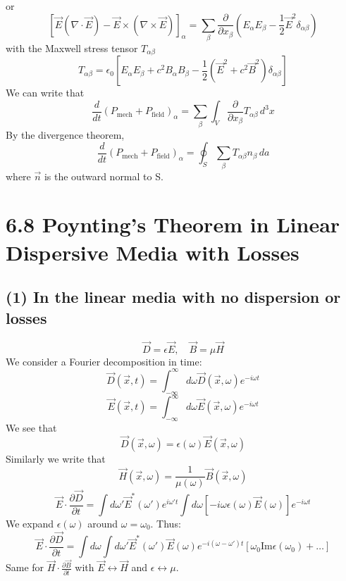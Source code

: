 \documentclass{article}
\begin{document}
\begin{enumerate}
		or
		\[ [ \vec{E}(\nabla \cdot \vec{E}) - \vec{E} \times (\nabla \times \vec{E}) ]_\alpha = \sum_\beta \frac{\partial}{\partial x_\beta} \left( E_\alpha E_\beta - \frac{1}{2} \vec{E}^2 \delta_{\alpha\beta} \right) \]
		with the Maxwell stress tensor $T_{\alpha\beta}$
		\[ T_{\alpha\beta} = \epsilon_0 \left[ E_\alpha E_\beta + c^2 B_\alpha B_\beta - \frac{1}{2} (\vec{E}^2 + c^2 \vec{B}^2) \delta_{\alpha\beta} \right] \]
		We can write that
		\[ \frac{d}{dt} (P_{\text{mech}} + P_{\text{field}})_\alpha = \sum_\beta \int_V \frac{\partial}{\partial x_\beta} T_{\alpha\beta} \, d^3x \]
		By the divergence theorem,
		\[ \frac{d}{dt} (P_{\text{mech}} + P_{\text{field}})_\alpha = \oint_S \sum_\beta T_{\alpha\beta} n_\beta \, da \]
		where $\vec{n}$ is the outward normal to S.
		
	\end{enumerate}
	\section*{6.8 Poynting's Theorem in Linear Dispersive Media with Losses}
	\subsection*{(1) In the linear media with no dispersion or losses}
	\[
	\vec{D} = \epsilon \vec{E}, \quad \vec{B} = \mu \vec{H}
	\]
	We consider a Fourier decomposition in time:
	\[
	\vec{D}(\vec{x}, t) = \int_{-\infty}^{\infty} d\omega \vec{D}(\vec{x}, \omega) e^{-i\omega t}
	\]
	\[
	\vec{E}(\vec{x}, t) = \int_{-\infty}^{\infty} d\omega \vec{E}(\vec{x}, \omega) e^{-i\omega t}
	\]
	We see that
	\[
	\vec{D}(\vec{x}, \omega) = \epsilon(\omega) \vec{E}(\vec{x}, \omega)
	\]
	Similarly we write that
	\[
	\vec{H}(\vec{x}, \omega) = \frac{1}{\mu(\omega)} \vec{B}(\vec{x}, \omega)
	\]
	\[
	\vec{E} \cdot \frac{\partial\vec{D}}{\partial t} = \int d\omega' \vec{E}^*(\omega') e^{i\omega' t} \int d\omega [-i\omega \epsilon(\omega) \vec{E}(\omega)] e^{-i\omega t}
	\]
	We expand $\epsilon(\omega)$ around $\omega = \omega_0$.
	Thus:
	\[
	\vec{E} \cdot \frac{\partial \vec{D}}{\partial t} = \int d\omega \int d\omega' \vec{E}^*(\omega') \vec{E}(\omega) e^{-i(\omega-\omega')t} [ \omega_0 \text{Im} \epsilon(\omega_0) + \dots ]
	\]
	Same for $\vec{H} \cdot \frac{\partial\vec{B}}{\partial t}$ with $\vec{E} \leftrightarrow \vec{H}$ and $\epsilon \leftrightarrow \mu$.
	
\end{document}
